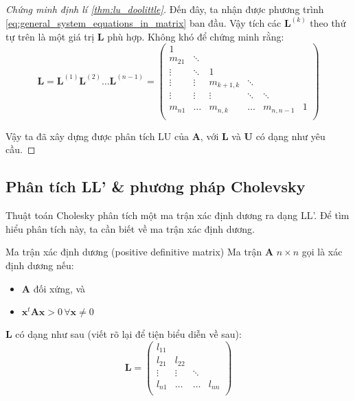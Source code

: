 \documentclass[../../Lectures]{subfiles}
\begin{document}
\begin{proof}[Chứng minh định lí \ref{thm:lu_doolittle}]
    Đến đây, ta nhận được phương trình
    \eqref{eq:general_system_equations_in_matrix} ban đầu. Vậy tích các
    \(\bm{L}^{(k)}\) theo thứ tự trên là một giá trị \(\bm{L}\) phù hợp. Không
    khó để chứng minh rằng:
    \[
        \bm{L} = \bm{L}^{(1)} \bm{L}^{(2)} \ldots \bm{L}^{(n - 1)} =
            \begin{pmatrix}
                    1   &          &                &          &                &     \\
                m_{21}  &  \ddots  &                &          &                &     \\
                \vdots  &  \ddots  &        1       &          &                &     \\
                \vdots  &  \vdots  &  m_{k + 1, k}  &  \ddots  &                &     \\
                \vdots  &  \vdots  &     \vdots     &  \ddots  &     \ddots     &     \\
                m_{n1}  &  \dots   &  m_{n, k}      &  \dots   &  m_{n, n - 1}  &  1  \\
            \end{pmatrix}
    \]

    Vậy ta đã xây dựng được phân tích LU của \(\bm{A}\), với \(\bm{L}\) và
    \(\bm{U}\) có dạng như yêu cầu.

\end{proof}

\subsection{Phân tích LL' \& phương pháp Cholevsky}

Thuật toán Cholesky phân tích một ma trận xác định dương ra dạng LL'. Để tìm
hiểu phân tích này, ta cần biết về ma trận xác định dương.

\begin{cdefinition}{Ma trận xác định dương (positive definitive matrix)}{}
    Ma trận \(\bm{A}\) \(n \times n\) gọi là xác định dương nếu:
    \begin{itemize}
        \item \(\bm{A}\) đối xứng, và
        \item \(\bm{x}^t \bm{A} \bm{x} > 0 \, \forall \bm{x} \neq 0\)
    \end{itemize}
\end{cdefinition}

\(\bm{L}\) có dạng như sau (viết rõ lại để tiện biểu diễn về sau):
\[
    \bm{L} =
        \begin{pmatrix}
            l_{11}  &          &          &        \\
            l_{21}  &  l_{22}  &          &        \\
            \vdots  &  \vdots  &  \ddots  &        \\
            l_{n1}  &  \dots   &  \dots   &  l_{nn}\\
        \end{pmatrix}
\]
\end{document}
